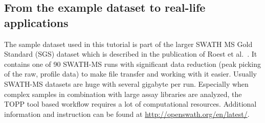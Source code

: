 \subsection{From the example dataset to real-life applications}
The sample dataset used in this tutorial is part of the larger SWATH MS Gold Standard (SGS) dataset which is described in the publication of Roest et al.~\cite{Rost2014fd}.
It contains one of 90 SWATH-MS runs with significant data reduction (peak picking of the raw, profile data) to make file transfer and working with it easier. Usually SWATH-MS datasets are huge with several gigabyte per run. Especially when complex samples in combination with large assay libraries are analyzed, the TOPP tool based workflow requires a lot of computational resources. Additional information and instruction can be found at \url{http://openswath.org/en/latest/}.

